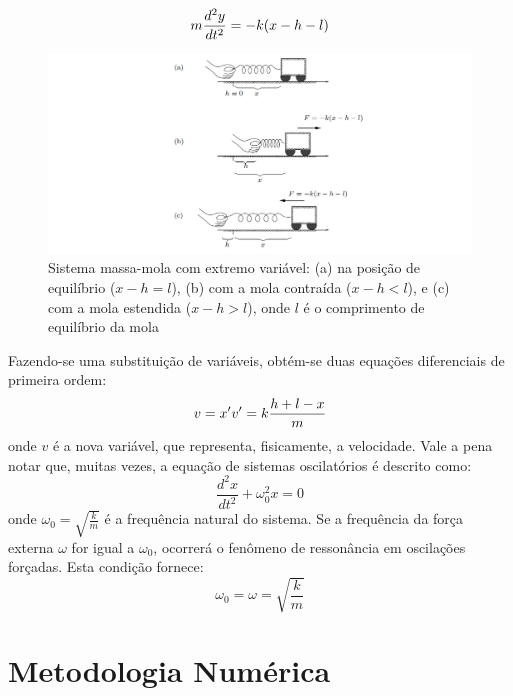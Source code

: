 \documentclass[12pt,fleqn]{article}
\begin{document}
\begin{equation}
\centering
m\frac{d^2y}{dt^2}=-k(x-h-l)
\end{equation}

\begin{figure}[h]

\centering
\includegraphics[scale=0.5]{imagem}
\caption{Sistema massa-mola com extremo variável: (a) na posição de equilíbrio ($x - h = l$), (b) com a mola contraída ($x - h < l$), e (c) com a mola estendida ($x - h > l$), onde $l$ é o comprimento de equilíbrio da mola}
\label{fig:inicial}
\end{figure}


\par
Fazendo-se uma substituição de variáveis, obtém-se duas equações diferenciais de primeira ordem:
\begin{equation}
\label{EDO}
v=x'\\
v'=k\frac{h+l-x}{m}
\end{equation}
onde $v$ é a nova variável, que representa, fisicamente, a velocidade.
Vale a pena notar que, muitas vezes, a equação de sistemas oscilatórios é descrito como:
\begin{equation}
    \frac{d^2x}{dt^2}+\omega_{0}^2x=0
\end{equation}
onde $\omega_{0}=\sqrt{\frac{k}{m}}$ é a frequência natural do sistema. Se a frequência da força externa $\omega$ for igual a $\omega_{0}$, ocorrerá o fenômeno de ressonância em oscilações forçadas. Esta condição fornece:
\begin{equation}
\label{omega}
    \omega_{0}=\omega=\sqrt{\frac{k}{m}}
\end{equation}

\section{Metodologia Numérica}
\end{document}

